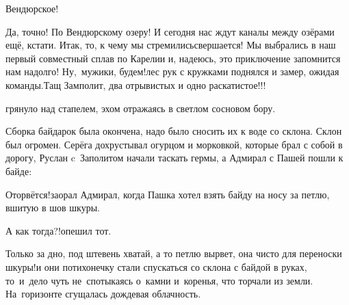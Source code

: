 \diagdash Вендюрское! 

\diagdash Да, точно! По Вендюрскому озеру! И сегодня нас ждут каналы между озёрами ещё, кстати. Итак, то, к чему мы стремились\mdash свершается! Мы выбрались в наш первый совместный сплав по Карелии и, надеюсь, это приключение запомнится нам надолго! Ну,~мужики, будем!\mdash лес рук с кружками поднялся и замер, ожидая команды.\mdash Тащ Замполит, два отрывистых и одно раскатистое!!!

\mdash грянуло над стапелем, эхом отражаясь в светлом сосновом бору.

Сборка байдарок была окончена, надо было сносить их к воде со склона. Склон был огромен. Серёга дохрустывал огурцом и морковкой, которые брал с собой в дорогу, Руслан c~Заполитом начали таскать гермы, а Адмирал с Пашей пошли к байде:

 Оторвётся!\mdash заорал Адмирал, когда Пашка хотел взять байду на носу за петлю, вшитую в шов шкуры.

\diagdash А как тогда?!\mdash опешил тот.

\diagdash Только за дно, под штевень хватай, а то петлю вырвет, она чисто для переноски шкуры!\mdash и они потихонечку стали спускаться со склона с байдой в руках, то~и~дело чуть не~спотыкаясь о~камни и~коренья, что торчали из земли. На~горизонте сгущалась дождевая облачность.






\begin{center}
\end{center}
